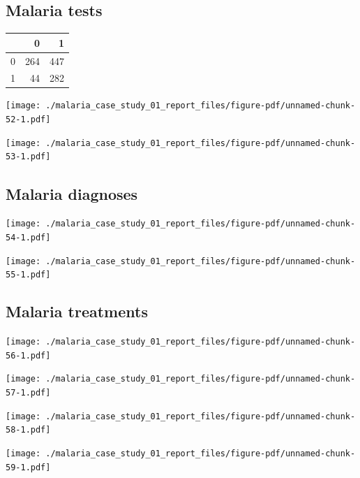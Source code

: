 \documentclass[
  letterpaper,
  DIV=11,
  numbers=noendperiod,
  oneside]{scrreprt}
\begin{document}
\hypertarget{malaria-tests-1}{%
\subsection{Malaria tests}\label{malaria-tests-1}}

\begin{longtable}[]{@{}lrr@{}}
\toprule()
& 0 & 1 \\
\midrule()
\endhead
0 & 264 & 447 \\
1 & 44 & 282 \\
\bottomrule()
\end{longtable}

\texttt{[image: ./malaria\_case\_study\_01\_report\_files/figure-pdf/unnamed-chunk-52-1.pdf]}

\texttt{[image: ./malaria\_case\_study\_01\_report\_files/figure-pdf/unnamed-chunk-53-1.pdf]}

\hypertarget{malaria-diagnoses}{%
\subsection{Malaria diagnoses}\label{malaria-diagnoses}}

\texttt{[image: ./malaria\_case\_study\_01\_report\_files/figure-pdf/unnamed-chunk-54-1.pdf]}

\texttt{[image: ./malaria\_case\_study\_01\_report\_files/figure-pdf/unnamed-chunk-55-1.pdf]}

\hypertarget{malaria-treatments-1}{%
\subsection{Malaria treatments}\label{malaria-treatments-1}}

\texttt{[image: ./malaria\_case\_study\_01\_report\_files/figure-pdf/unnamed-chunk-56-1.pdf]}

\texttt{[image: ./malaria\_case\_study\_01\_report\_files/figure-pdf/unnamed-chunk-57-1.pdf]}

\texttt{[image: ./malaria\_case\_study\_01\_report\_files/figure-pdf/unnamed-chunk-58-1.pdf]}

\texttt{[image: ./malaria\_case\_study\_01\_report\_files/figure-pdf/unnamed-chunk-59-1.pdf]}
\end{document}
